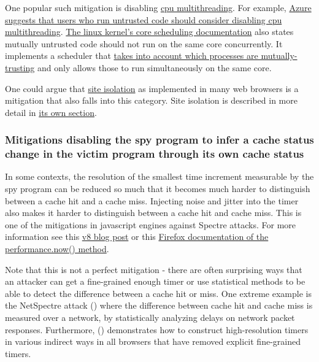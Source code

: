 \documentclass[
  a4paper,
]{report}
\begin{document}
One popular such mitigation is disabling
\href{https://en.wikipedia.org/wiki/Multithreading_(computer_architecture)}{\label{__index_entry_135}{cpu
multithreading}}. For example,
\href{https://learn.microsoft.com/en-us/azure/virtual-machines/mitigate-se}{Azure
suggests that users who run untrusted code should consider disabling cpu
multithreading}.
\href{https://www.kernel.org/doc/Documentation/admin-guide/hw-vuln/core-scheduling.rst}{The
linux kernel's core scheduling documentation} also states mutually
untrusted code should not run on the same core concurrently. It
implements a scheduler that
\href{https://lwn.net/Articles/861251/}{takes into account which
processes are mutually-trusting} and only allows those to run
simultaneously on the same core.

One could argue that
\href{https://developer.chrome.com/blog/site-isolation/}{\label{__index_entry_136}{site
isolation}} as implemented in many web browsers is
a mitigation that also falls into this category. Site isolation is
described in more detail in \hyperref[site-isolation]{its own section}.

\subsubsection{Mitigations disabling the spy program to infer a cache
status change in the victim program through its own cache
status}\label{mitigations-disabling-the-spy-program-to-infer-a-cache-status-change-in-the-victim-program-through-its-own-cache-status}

In some contexts, the resolution of the smallest time increment
measurable by the spy program can be reduced so much that it becomes
much harder to distinguish between a cache hit and a cache miss.
Injecting noise and jitter into the timer also makes it harder to
distinguish between a cache hit and cache miss. This is one of the
mitigations in javascript engines against Spectre attacks. For more
information see this \href{https://v8.dev/blog/spectre}{v8 blog post} or
this
\href{https://developer.mozilla.org/en-US/docs/Web/API/Performance/now}{Firefox
documentation of the performance.now()
method}\label{__index_entry_137}{}.

Note that this is not a perfect mitigation - there are often surprising
ways that an attacker can get a fine-grained enough timer or use
statistical methods to be able to detect the difference between a cache
hit or miss. One extreme example is the
\label{__index_entry_138}{NetSpectre}
attack () where the
difference between cache hit and cache miss is measured over a network,
by statistically analyzing delays on network packet responses.
Furthermore, ()
demonstrates how to construct high-resolution timers in various indirect
ways in all browsers that have removed explicit fine-grained timers.
\end{document}
